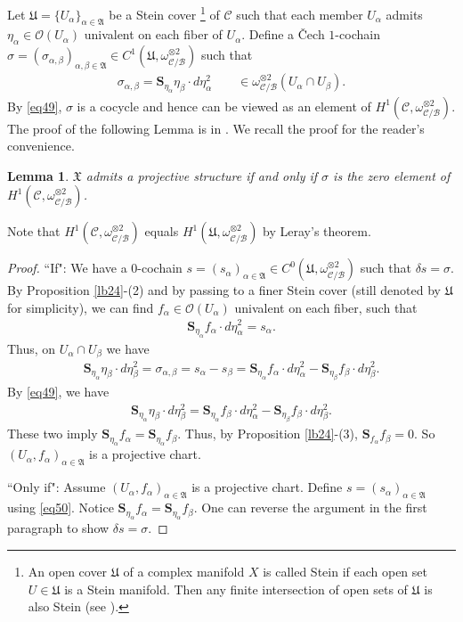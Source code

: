 \documentclass[12pt,a4paper,notitlepage]{article}
\theoremstyle{definition}
\theoremstyle{plain}
\newtheorem{lm}[df]{Lemma}
\newcommand{\fk}{\mathfrak}
\newcommand{\mc}{\mathcal}
\newcommand{\scr}{\mathscr}
\newcommand{\Sbf}{\mathbf{S}}
\numberwithin{equation}{section}
\begin{document}
Let $\fk U=\{U_\alpha\}_{\alpha\in\fk A}$ be a Stein cover \footnote{An open cover $\fk U$ of a complex manifold $X$ is called Stein if each open set $U\in\fk U$ is a Stein manifold. Then any finite intersection of open sets of $\fk U$ is also Stein (see \cite[Sec. 1.4.4]{GR84}).} of $\mc C$ such that each member $U_\alpha$ admits $\eta_\alpha\in\scr O(U_\alpha)$ univalent on each fiber of $U_\alpha$. Define a \v Cech $1$-cochain $\sigma=(\sigma_{\alpha,\beta})_{\alpha,\beta\in\fk A}\in C^1(\fk U,\omega_{\mc C/\mc B}^{\otimes 2})$ such that 
\begin{align*}
\sigma_{\alpha,\beta}=\Sbf_{\eta_\alpha}\eta_\beta\cdot d\eta_\alpha^2\qquad \in\omega_{\mc C/\mc B}^{\otimes 2}(U_\alpha\cap U_\beta).
\end{align*}
By \eqref{eq49}, $\sigma$ is a cocycle and hence can be viewed as an element of $H^1(\mc C,\omega_{\mc C/\mc B}^{\otimes 2})$. The proof of the following Lemma is in \cite[Lemma 5]{Hub81}. We recall the proof for the reader's convenience.

\begin{lm}\label{lb26}
	$\fk X$ admits a projective structure if and only if $\sigma$ is the zero element of $H^1(\mc C,\omega_{\mc C/\mc B}^{\otimes 2})$.
\end{lm}

Note that $H^1(\mc C,\omega_{\mc C/\mc B}^{\otimes 2})$ equals $H^1(\fk U,\omega_{\mc C/\mc B}^{\otimes 2})$ by Leray's theorem.

\begin{proof}
	``If": We have a $0$-cochain $s=(s_\alpha)_{\alpha\in\fk A}\in C^0(\fk U,\omega_{\mc C/\mc B}^{\otimes 2})$ such that $\delta s=\sigma$. By Proposition \ref{lb24}-(2) and by passing to a finer Stein cover (still denoted by $\fk U$ for simplicity), we can find $f_\alpha\in\scr O(U_\alpha)$ univalent on each fiber, such that
	\begin{align}
	\Sbf_{\eta_\alpha}f_\alpha\cdot d\eta_\alpha^2=s_\alpha.\label{eq50}
	\end{align}
	Thus, on $U_\alpha\cap U_\beta$ we have
	\begin{align*}
	\Sbf_{\eta_\alpha}\eta_\beta\cdot d\eta_\beta^2=\sigma_{\alpha,\beta}=s_\alpha-s_\beta=\Sbf_{\eta_\alpha}f_\alpha\cdot d\eta_\alpha^2-\Sbf_{\eta_\beta}f_\beta\cdot d\eta_\beta^2.
	\end{align*}
	By \eqref{eq49}, we have
	\begin{align*}
	\Sbf_{\eta_\alpha}\eta_\beta\cdot d\eta_\beta^2=\Sbf_{\eta_\alpha}f_\beta\cdot d\eta_\alpha^2-\Sbf_{\eta_\beta}f_\beta\cdot d\eta_\beta^2.
	\end{align*}
	These two imply $\Sbf_{\eta_\alpha}f_\alpha=\Sbf_{\eta_\alpha}f_\beta$. Thus, by Proposition \ref{lb24}-(3), $\Sbf_{f_\alpha}f_\beta=0$. So $(U_\alpha,f_\alpha)_{\alpha\in\fk A}$ is a projective chart.
	
	``Only if": Assume $(U_\alpha,f_\alpha)_{\alpha\in\fk A}$ is a projective chart. Define $s=(s_\alpha)_{\alpha\in\fk A}$ using \eqref{eq50}. Notice $\Sbf_{\eta_\alpha}f_\alpha=\Sbf_{\eta_\alpha}f_\beta$. One can reverse the argument in the first paragraph to show $\delta s=\sigma$.
\end{proof}
\end{document}
